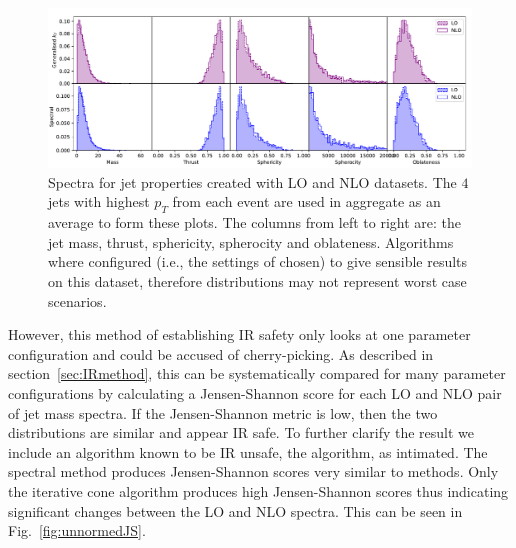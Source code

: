 \begin{figure}[htp]
    \includegraphics[width=\textwidth]{graphics/array_of_variables2_filled}
    \caption{Spectra for jet properties created with LO and NLO datasets.
             The \(4\) jets with highest \(p_T\) from each event are used in aggregate as an average to 
             form these plots.
             The columns from left to right are: the jet mass, 
             thrust, sphericity, spherocity and oblateness.
             Algorithms where configured (i.e., the settings of \stoppingdeltar{} chosen)
             to give sensible results on
             this dataset, therefore distributions may not represent worst case scenarios.
         }\label{fig:IRC_singles2}
\end{figure}    

However, this method of establishing IR safety only looks at one parameter configuration and could be accused of cherry-picking.
As described in section~\ref{sec:IRmethod}, this can be systematically compared for many parameter configurations by calculating a Jensen-Shannon
score for each LO and NLO pair of jet mass spectra.
If the Jensen-Shannon metric is low, then the two distributions are similar and appear IR safe.
To further clarify the result we include an algorithm known to be IR unsafe, the \itercone{} algorithm, as intimated.
The spectral method produces Jensen-Shannon scores very similar to \genkt{} methods.
Only the iterative cone algorithm produces high Jensen-Shannon scores thus indicating significant changes between the LO and NLO spectra.
This can be seen in Fig.~\ref{fig:unnormedJS}.

